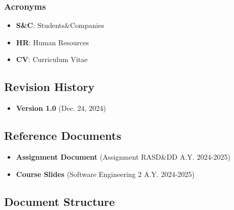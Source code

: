 \documentclass{article}
\begin{document}

\subsubsection{Acronyms}

\begin{itemize}
    \item \textbf{S\&C}: Students\&Companies
    \item \textbf{HR}: Human Resources
    \item \textbf{CV}: Curriculum Vitae
\end{itemize}


\subsection{Revision History}

\begin{itemize}
    \item \textbf{Version 1.0} (Dec. 24, 2024)
\end{itemize}

\subsection{Reference Documents}

\begin{itemize}
    \item \textbf{Assignment Document} (Assignment RASD\&DD A.Y. 2024-2025)
    \item \textbf{Course Slides} (Software Engineering 2 A.Y. 2024-2025)
\end{itemize}

\subsection{Document Structure}
\end{document}
